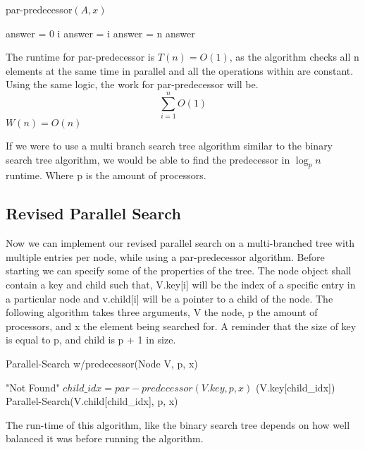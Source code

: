 \documentclass[11pt]{article}
\begin{document}
\begin{algorithm}
\caption{par-predecessor$(A,x)$}
\begin{algorithmic}
\STATE answer = 0
    	\RETURN i
    	\STATE answer = i
	\ENDIF
    	\STATE answer = n
	\ENDIF
	\RETURN answer
\ENDFOR
\end{algorithmic}
\end{algorithm}

The runtime for par-predecessor is $T(n) = O(1)$, as the algorithm checks all n elements at the same time in parallel and all the operations within are constant.
Using the same logic, the work for par-predecessor will be. $$\sum_{i=1}^{n}O(1)$$
$W(n) = O(n)$

If we were to use a multi branch search tree algorithm similar to the binary search tree algorithm, we would be able to find the predecessor in $\log_p n$ runtime. Where p is the amount of processors.


\subsection{Revised Parallel Search}

Now we can implement our revised parallel search on a multi-branched tree with multiple entries per node, while using a par-predecessor algorithm. Before starting we can specify some of the properties of the tree. The node object shall contain a key and child such that, V.key[i] will be the index of a specific entry in a particular node and v.child[i] will be a pointer to a child of the node. The following algorithm takes three arguments, V the node, p the amount of processors, and x the element being searched for. A reminder that the size of key is equal to p, and child is p + 1 in size.

\begin{algorithm}
\caption{Parallel-Search w/predecessor(Node V, p, x)}
\begin{algorithmic}
	\RETURN "Not Found"
\ENDIF
\STATE $child\_idx = par-predecessor(V.key, p, x)$
	\RETURN (V.key[child\_idx])
\ELSE
	\RETURN Parallel-Search(V.child[child\_idx], p, x)
\ENDIF
\end{algorithmic}
\end{algorithm}

The run-time of this algorithm, like the binary search tree depends on how well balanced it was before running the algorithm.


%

\end{document}
